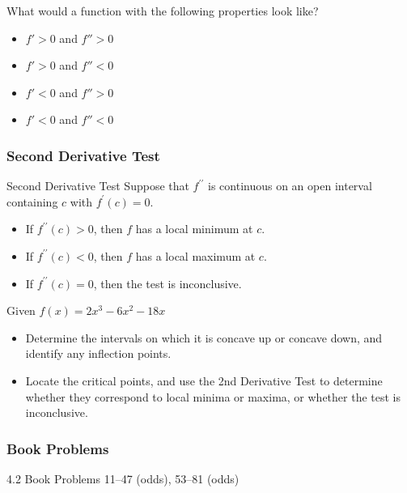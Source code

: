 \documentclass[cal1spr16Lectures.tex]{subfiles}
\begin{document}
\begin{frame}
\begin{ex}
What would a function with the following properties look like?
\begin{itemize}
\item[1. ] $f'>0$ and $f''>0$
\item[2. ] $f'>0$ and $f''<0$
\item[3. ] $f'<0$ and $f''>0$
\item[4. ] $f'<0$ and $f''<0$ 
\end{itemize}
\end{ex}
\end{frame}

\subsubsection{Second Derivative Test}

\begin{frame}{\small Second Derivative Test}
Suppose that $f^{\prime\prime}$ is continuous on an open interval containing $c$ with $f^{\prime}(c)=0$.

\begin{itemize}
\item If $f^{\prime\prime}(c)>0$, then $f$ has a \alert{local minimum} at $c$.

\vspace{0.5pc}
\item If $f^{\prime\prime}(c)<0$, then $f$ has a \alert{local maximum} at $c$.

\vspace{0.5pc}
\item If $f^{\prime\prime}(c)=0$, then the test is inconclusive.
\end{itemize}

\end{frame}

\begin{frame}
\begin{exe}
Given $f(x)=2x^3-6x^2-18x$
\begin{itemize}
\item[(a)] Determine the intervals on which it is concave up or concave down, and identify any inflection points.
\item[(b)] Locate the critical points, and use the 2nd Derivative Test to determine whether they correspond to local minima or maxima, or whether the test is inconclusive.
\end{itemize}
\end{exe}
\end{frame}

\subsubsection{Book Problems}


\begin{frame}
\begin{block}{4.2 Book Problems}
11--47 (odds), 53--81 (odds)
\end{block}
\end{frame}
\end{document}
